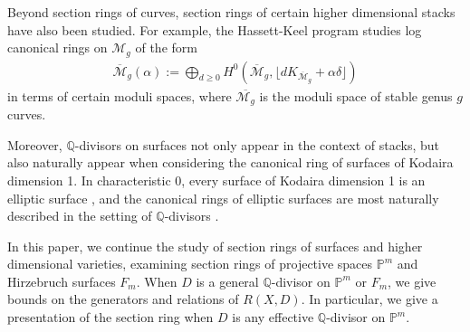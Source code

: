 \documentclass{amsart}
\theoremstyle{plain}
\theoremstyle{definition}
\theoremstyle{remark}
\numberwithin{equation}{section}
\newcommand\bq{{\mathbb Q}}
\newcommand\bp{{\mathbb P}}
\newcommand\hirz{F}
\begin{document}
Beyond section rings of curves, section rings of certain higher dimensional
stacks have also been studied.
For example, the Hassett-Keel program \cite{hassett:classical-and-minimal-models}
studies log canonical rings on ${\mathscr M}_g$ of the form 
\begin{align*}
	\overline {\mathscr M}_g(\alpha) := \bigoplus_{d \geq 0} H^0 \left(
	\overline {\mathscr M}_g, \lfloor d K_{\overline{\mathscr M}_g} +
	\alpha\delta \rfloor  \right) 
\end{align*}
in terms of certain moduli spaces, where $\overline {\mathscr M_g}$ is the
moduli space of stable genus $g$ curves.

Moreover, $\bq$-divisors on surfaces not only appear in the context of stacks,
but also naturally
appear when considering the canonical ring of surfaces of Kodaira dimension 1.
In characteristic 0, every surface of Kodaira dimension 1 is an elliptic surface \cite[p. 244]{
barthHPV:compactComplexSurfaces}, and
the canonical rings of elliptic surfaces are most naturally described in the setting of
$\bq$-divisors \cite[Chapter V, Theorem 12.1]{barthHPV:compactComplexSurfaces}. 

In this paper, we continue the study of section rings of
surfaces and higher dimensional varieties, examining section rings of
projective spaces $\bp^m$ and Hirzebruch surfaces $\hirz_m$.
When $D$ is a general $\bq$-divisor on $\bp^m$ or
$\hirz_m$, we give bounds on the generators and relations of
$R(X, D)$. In particular, we give a presentation of the
section ring when $D$ is any effective
$\bq$-divisor on $\bp^m$.  
\end{document}
